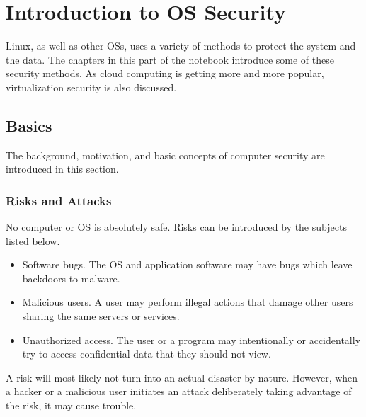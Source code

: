 \chapter{Introduction to OS Security}

Linux, as well as other OSs, uses a variety of methods to protect the system and the data. The chapters in this part of the notebook introduce some of these security methods. As cloud computing is getting more and more popular, virtualization security is also discussed.

\section{Basics}

The background, motivation, and basic concepts of computer security are introduced in this section.

\subsection{Risks and Attacks}

No computer or OS is absolutely safe. Risks can be introduced by the subjects listed below.
\begin{itemize}
	\item Software bugs. The OS and application software may have bugs which leave backdoors to malware.
	\item Malicious users. A user may perform illegal actions that damage other users sharing the same servers or services.
	\item Unauthorized access. The user or a program may intentionally or accidentally try to access confidential data that they should not view.
\end{itemize}
A risk will most likely not turn into an actual disaster by nature. However, when a hacker or a malicious user initiates an attack deliberately taking advantage of the risk, it may cause trouble.

